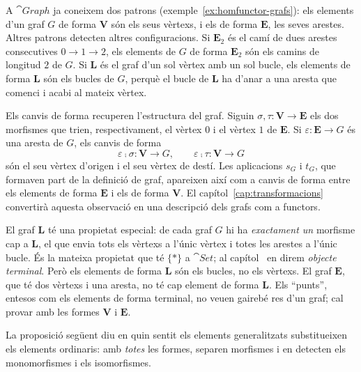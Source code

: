 \begin{exemple}\label{ex:elements-graf}
A $\cat{Graph}$ ja coneixem dos patrons (exemple~\ref{ex:homfunctor-grafs}): els elements d'un graf $G$ de forma $\mathbf V$ són els seus vèrtexs, i els de forma $\mathbf E$, les seves arestes. Altres patrons detecten altres configuracions. Si $\mathbf E_2$ és el camí de dues arestes consecutives $0\to1\to2$, els elements de $G$ de forma $\mathbf E_2$ són els camins de longitud $2$ de $G$. Si $\mathbf L$ és el graf d'un sol vèrtex amb un sol bucle, els elements de forma $\mathbf L$ són els bucles de $G$, perquè el bucle de $\mathbf L$ ha d'anar a una aresta que comenci i acabi al mateix vèrtex.

Els canvis de forma recuperen l'estructura del graf. Siguin $\sigma,\tau\colon\mathbf V\to\mathbf E$ els dos morfismes que trien, respectivament, el vèrtex $0$ i el vèrtex $1$ de $\mathbf E$. Si $\varepsilon\colon\mathbf E\to G$ és una aresta de $G$, els canvis de forma
\[
\varepsilon\comp\sigma\colon\mathbf V\to G,
\qquad
\varepsilon\comp\tau\colon\mathbf V\to G
\]
són el seu vèrtex d'origen i el seu vèrtex de destí. Les aplicacions $s_G$ i $t_G$, que formaven part de la definició de graf, apareixen així com a canvis de forma entre els elements de forma $\mathbf E$ i els de forma $\mathbf V$. El capítol~\ref{cap:transformacions} convertirà aquesta observació en una descripció dels grafs com a functors.

El graf $\mathbf L$ té una propietat especial: de cada graf $G$ hi ha \emph{exactament un} morfisme cap a $\mathbf L$, el que envia tots els vèrtexs a l'únic vèrtex i totes les arestes a l'únic bucle. És la mateixa propietat que té $\{\ast\}$ a $\cat{Set}$; al capítol~ en direm \emph{objecte terminal}. Però els elements de forma $\mathbf L$ són els bucles, no els vèrtexs. El graf $\mathbf E$, que té dos vèrtexs i una aresta, no té cap element de forma $\mathbf L$. Els \enquote{punts}, entesos com els elements de forma terminal, no veuen gairebé res d'un graf; cal provar amb les formes $\mathbf V$ i $\mathbf E$.
\end{exemple}

La proposició següent diu en quin sentit els elements generalitzats substitueixen els elements ordinaris: amb \emph{totes} les formes, separen morfismes i en detecten els monomorfismes i els isomorfismes.

